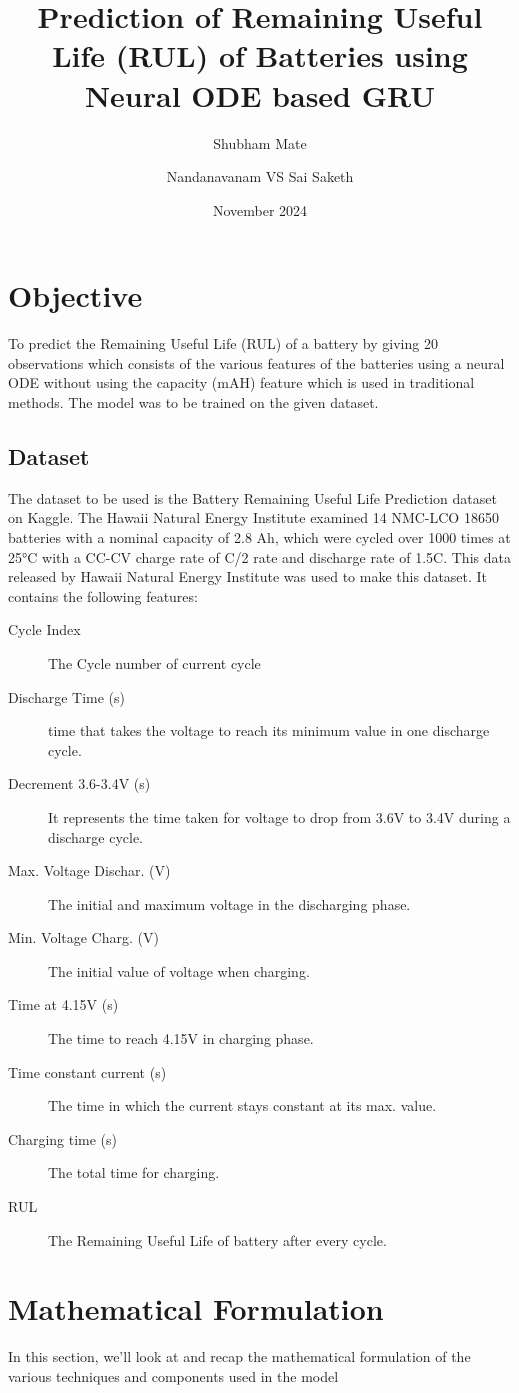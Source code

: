 \documentclass[12pt]{article}
\title{\textbf{Prediction of Remaining Useful Life (RUL) of Batteries using Neural ODE based GRU}}
\author{Shubham Mate}
\author{Nandanavanam VS Sai Saketh}
\affil{Department of Mathematical Sciences, IIT (BHU), Varanasi}
\affil{\texttt{mate.shubhamvijay.mat23@itbhu.ac.in, nvssai.saketh.mat23@itbhu.ac.in}}
\date{November 2024}
\begin{document}
	
	\maketitle
	\section{Objective}
		
		\footnotesize{To predict the Remaining Useful Life (RUL) of a battery by giving 20 observations which consists of the various features of the batteries using a neural ODE without using the capacity (mAH) feature which is used in traditional methods. The model was to be trained on the given dataset.}
		\subsection{Dataset}
			\footnotesize{The dataset to be used is the Battery Remaining Useful Life Prediction dataset on Kaggle. The Hawaii Natural Energy Institute examined 14 NMC-LCO 18650 batteries with a nominal capacity of 2.8 Ah, which were cycled over 1000 times at 25°C with a CC-CV charge rate of C/2 rate and discharge rate of 1.5C. This data released by Hawaii Natural Energy Institute was used to make this dataset. It contains the following features:
			\begin{description}
				\item[Cycle Index] The Cycle number of current cycle
				\item[Discharge Time (s)] time that takes the voltage to reach its minimum value in one discharge cycle.
				\item[Decrement 3.6-3.4V (s)] It represents the time taken for voltage to drop from 3.6V to 3.4V during a discharge cycle.
				\item[Max. Voltage Dischar. (V)] The initial and maximum voltage in the discharging phase.
				\item[Min. Voltage Charg. (V)] The initial value of voltage when charging.
				\item[Time at 4.15V (s)] The time to reach 4.15V in charging phase.
				\item[Time constant current (s)] The time in which the current stays constant at its max. value.
				\item[Charging time (s)] The total time for charging.
				\item[RUL] The Remaining Useful Life of battery after every cycle.
			\end{description}}
	\section{Mathematical Formulation}
		\footnotesize{In this section, we'll look at and recap the mathematical formulation of the various techniques and components used in the model}
\end{document}
